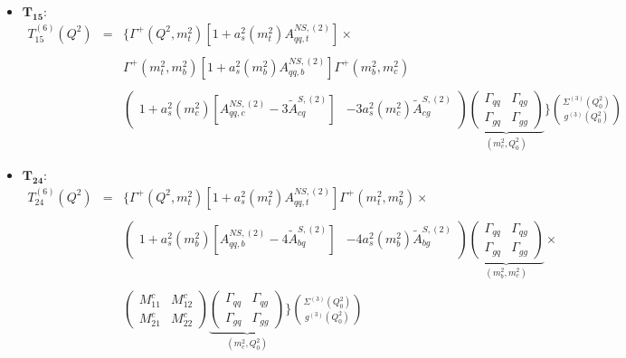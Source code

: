 \documentclass[10pt,a4paper]{article}
\begin{document}
\begin{itemize}
\item $\mathbf{T_{15}}$:
\begin{equation}
\begin{array}{rcl}
T^{(6)}_{15}(Q^2)&=&\displaystyle \Big\{\Gamma^{+}(Q^2,m_t^2)[1+a_s^2(m_t^2)A_{qq,t}^{N\!S,(2)}]\times\\
\\
& & \displaystyle \Gamma^{+}(m_t^2,m_b^2)[1+a_s^2(m_b^2)A_{qq,b}^{N\!S,(2)}]\Gamma^{+}(m_b^2,m_c^2)\\
\\
& & \displaystyle \begin{pmatrix} 1+a_s^2(m_c^2)[A_{qq,c}^{N\!S,(2)}-3\tilde{A}^{S,(2)}_{cq}] & -3a_s^2(m_c^2)\tilde{A}^{S,(2)}_{cg}\end{pmatrix}\underbrace{\begin{pmatrix}\Gamma_{qq}& \Gamma_{qg} \\ \Gamma_{gq} & \Gamma_{gg}\end{pmatrix}}_{(m_c^2,Q_0^2)}\Bigg\}{\Sigma^{(3)}(Q_0^2) \choose g^{(3)}(Q_0^2)}
\end{array}
\end{equation}
\item $\mathbf{T_{24}}$:
\begin{equation}
\begin{array}{rcl}
T^{(6)}_{24}(Q^2)&=&\displaystyle \Big\{\Gamma^{+}(Q^2,m_t^2)[1+a_s^2(m_t^2)A_{qq,t}^{N\!S,(2)}]\Gamma^{+}(m_t^2,m_b^2)\times\\
\\
& & \displaystyle \begin{pmatrix} 1+a_s^2(m_b^2)[A_{qq,b}^{N\!S,(2)}-4\tilde{A}^{S,(2)}_{bq}] & -4a_s^2(m_b^2)\tilde{A}^{S,(2)}_{bg}\end{pmatrix}\underbrace{\begin{pmatrix}\Gamma_{qq}& \Gamma_{qg} \\ \Gamma_{gq} & \Gamma_{gg}\end{pmatrix}}_{(m_b^2,m_c^2)}\times\\
\\
 & &\displaystyle\begin{pmatrix} M_{11}^c & M_{12}^c \\ M_{21}^c & M_{22}^c\end{pmatrix}\underbrace{\begin{pmatrix} \Gamma_{qq}& \Gamma_{qg} \\ \Gamma_{gq}& \Gamma_{gg}\end{pmatrix}}_{(m_c^2,Q_0^2)}\Bigg\}{\Sigma^{(3)}(Q_0^2) \choose g^{(3)}(Q_0^2)}
\end{array}

\end{equation}
\end{itemize}
\end{document}

